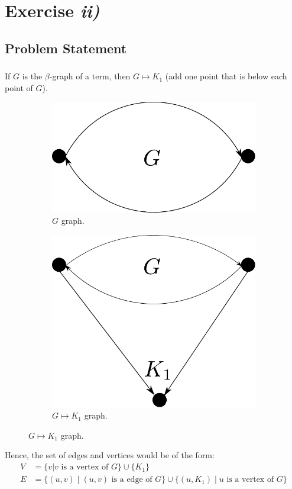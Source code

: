 \documentclass{beamer}
\theoremstyle{definition}
\theoremstyle{remark}
\theoremstyle{example}
\newif\ifinsection
\newif\ifinsubsection
\let\oldsection\section
\renewcommand{\section}{
  \global\insectiontrue
  \global\insubsectionfalse
  \oldsection}
\let\oldsubsection\subsection
\renewcommand{\subsection}{
  \global\insubsectiontrue
  \oldsubsection}
\newcommand {\aframe}[1] {
  \begin{frame}
    \ifinsection\frametitle{\secname}\fi
    \ifinsubsection\framesubtitle{\subsecname}\fi
  #1
  \end{frame}
}
\begin{document}
\section{Exercise \textit{ii)}}
\subsection{Problem Statement}
\aframe{ If $G$ is the $\beta$-graph of a term, then $G \mapsto K_1$
  (add one point that is below each point of $G$). \pause
  \begin{figure}[t]
    \centering
    \begin{subfigure}[b]{0.45\textwidth}
      \centering
      \includegraphics[scale=0.35]{../../graphs/exercise-3-5-7-ii-example-G}
      \caption{$G$ graph.}
    \end{subfigure} \pause
    \begin{subfigure}[b]{0.45\textwidth}
      \centering
      \includegraphics[scale=0.35]{../../graphs/exercise-3-5-7-ii-example-G-with-K}
      \caption{$G \mapsto K_1$ graph.}
    \end{subfigure} \pause
  \end{figure}
  Hence, the set of edges and vertices would be of the form:
    \begin{align*}
      V &= \{v | v \text{ is a vertex of } G\} \cup \{K_1\} \\
      E &= \{(u, v) \mid (u, v) \text{ is a edge of } G\} \cup
          \{(u, K_1) \mid u \text{ is a vertex of } G\}
    \end{align*}
  }
\end{document}
